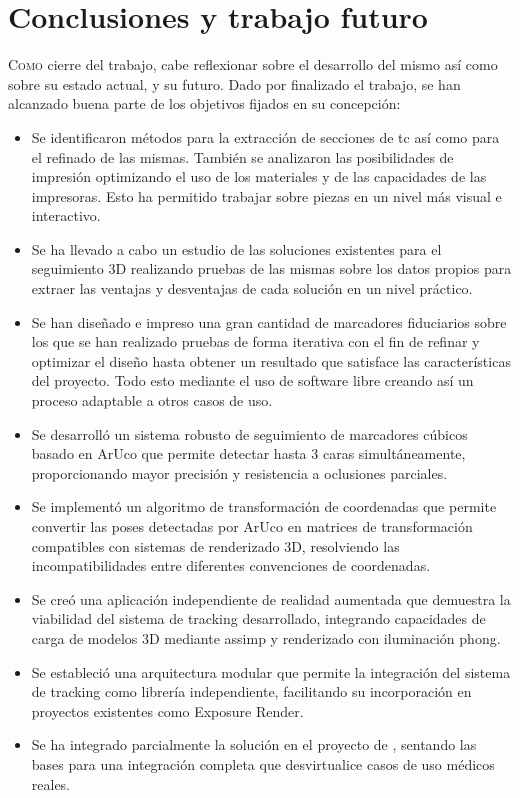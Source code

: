 \chapter{Conclusiones y trabajo futuro}\label{chap:c}
\lettrine{C}{omo} cierre del trabajo, cabe reflexionar sobre el desarrollo del mismo así como sobre su estado actual, y su futuro. Dado por finalizado el trabajo, se han alcanzado buena parte de los objetivos fijados en su concepción:

\begin{itemize}
	\item Se identificaron métodos para la extracción de secciones de \acrshort{tc} así como para el refinado de las mismas. También se analizaron las posibilidades de impresión optimizando el uso de los materiales y de las capacidades de las impresoras. Esto ha permitido trabajar sobre piezas en un nivel más visual e interactivo.
	\item Se ha llevado a cabo un estudio de las soluciones existentes para el seguimiento 3D realizando pruebas de las mismas sobre los datos propios para extraer las ventajas y desventajas de cada solución en un nivel práctico.
	\item Se han diseñado e impreso una gran cantidad de marcadores fiduciarios sobre los que se han realizado pruebas de forma iterativa con el fin de refinar y optimizar el diseño hasta obtener un resultado que satisface las características del proyecto. Todo esto mediante el uso de software libre creando así un proceso adaptable a otros casos de uso.
	\item Se desarrolló un sistema robusto de seguimiento de marcadores cúbicos basado en ArUco que permite detectar hasta 3 caras simultáneamente, proporcionando mayor precisión y resistencia a oclusiones parciales.
	\item Se implementó un algoritmo de transformación de coordenadas que permite convertir las poses detectadas por ArUco en matrices de transformación compatibles con sistemas de renderizado 3D, resolviendo las incompatibilidades entre diferentes convenciones de coordenadas.
	\item Se creó una aplicación independiente de realidad aumentada que demuestra la viabilidad del sistema de tracking desarrollado, integrando capacidades de carga de modelos 3D mediante \acrshort{assimp} y renderizado con iluminación \gls{phong}.
	\item Se estableció una arquitectura modular que permite la integración del sistema de tracking como librería independiente, facilitando su incorporación en proyectos existentes como Exposure Render.
	\item Se ha integrado parcialmente la solución en el proyecto de \citeauthor{IglesiasGuitian2022}, sentando las bases para una integración completa que desvirtualice casos de uso médicos reales.
\end{itemize}
